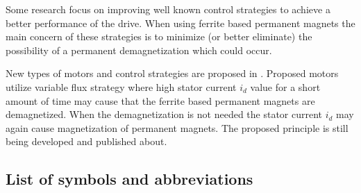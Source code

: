 \documentclass[a4paper, twoside, 11pt]{article}
\begin{document}
    Some research focus on improving well known control strategies to achieve a better performance of the drive. When using ferrite based permanent magnets the main concern of these strategies is to minimize (or better eliminate) the possibility of a permanent demagnetization which could occur.\par
    New types of motors and control strategies are proposed in \cite{ostovic-Memory-motors-a-new-class-of-controllable-flux-PM-machines-for-a-true-wide-speed-operation}. Proposed motors utilize variable flux strategy where high stator current $i_d$ value for a short amount of time may cause that the ferrite based permanent magnets are demagnetized. When the demagnetization is not needed the stator current $i_d$ may again cause magnetization of permanent magnets. The proposed principle is still being developed and published about.


\flushbottom %


\newpage
\setmonofont{Times New Roman}

\printbibliography[title={{References}}]	
\nocite{*}
\setmonofont{CourierPrime-Regular}

\appendix
{}

\begin{appendices}
	\section{List of symbols and abbreviations}

		\printglossary[type=abbreviationslist, style = myStyleAbbreviations]

		\FloatBarrier
		\printglossary[type=symbolslist, style =  myStyleSymbols]

	\end{appendices}
\end{document}
